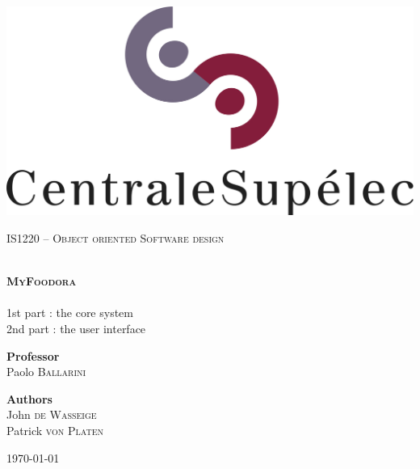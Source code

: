 \begin{titlepage}
\begin{center}

\includegraphics[scale=0.5]{./img/logo_centralesup.jpg} \hfill

\vfill 

\textsc{\Large IS1220 -- Object oriented Software design}\\[0.5cm]

\vfill

\HRule \\[0.4cm]
{ \LARGE \bfseries \textsc{MyFoodora}\\[0.4cm] }
\HRule \\[1.5cm]

{\Large 
1st part : the core system\\[0.1cm]
2nd part : the user interface\\[0.5cm]
}

\vfill

{\large
\begin{center}
  \textbf{Professor}\\[0.1cm]
  Paolo \textsc{Ballarini}
\end{center}
\vfill
\begin{center}
  \textbf{Authors}\\[0.1cm]
  John \textsc{de Wasseige}\\[0.1cm]
  Patrick \textsc{von Platen}
\end{center}
}

\vfill

{\large \today}

\end{center}
\end{titlepage}